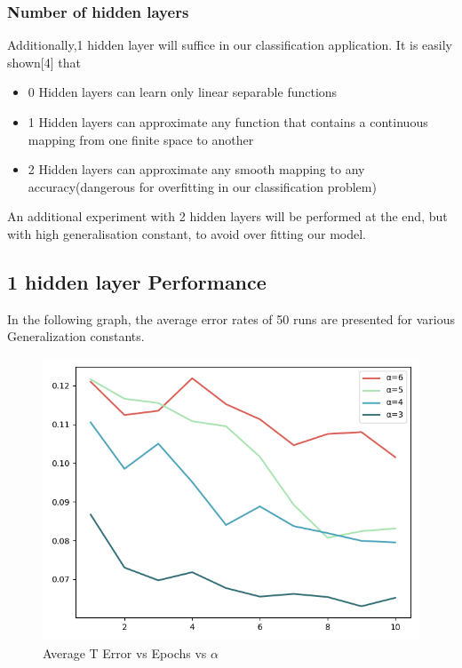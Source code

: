 \documentclass{proc}
\begin{document}
	\subsubsection{Number of hidden layers}
	Additionally,1 hidden layer will suffice in our classification application. It is easily shown[4] that 
	
	\begin{itemize}
		\item 0 Hidden layers can learn only linear separable functions
		\item 1 Hidden layers can approximate any function that contains a continuous mapping from one finite space to another
		\item 2 Hidden layers can approximate any smooth mapping to any accuracy(dangerous for overfitting in our classification problem)
	\end{itemize} 
	
	An additional experiment with 2 hidden layers will be performed at the end, but with high generalisation constant, to avoid over fitting our model.
	
	\subsection{1 hidden layer Performance}
	In the following graph, the average error rates of 50 runs are presented for various Generalization constants.
	\begin{figure}[!h]
		\includegraphics[width=\linewidth]{genone.png}
		\caption{Average T Error vs Epochs vs $\alpha$}
		\label{fig:1-X-1}
	\end{figure}
\end{document}
